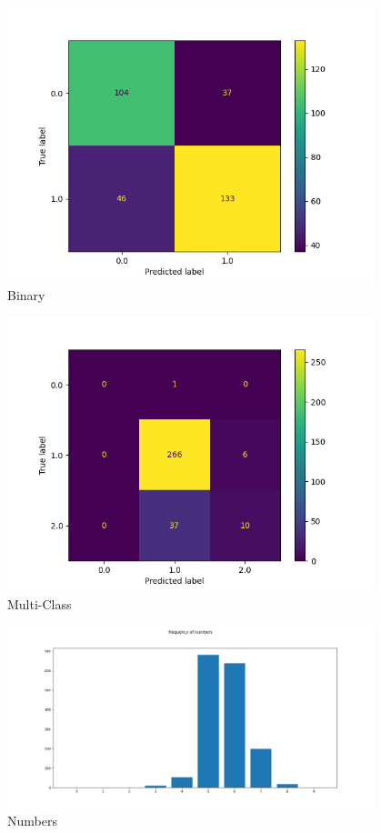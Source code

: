 \documentclass[11pt,a4paper]{scrartcl}
\begin{document}
\begin{figure}[h]
	\centering
	\includegraphics[width=0.95\textwidth]{conMatBinary.png}
	\caption{Binary}
	\label{fig:logo}
\end{figure}
\begin{figure}[h]
	\centering
	\includegraphics[width=0.95\textwidth]{conMatMulti.png}
	\caption{Multi-Class}
	\label{fig:logo}
\end{figure}	 
\begin{figure}[h]
	\centering
	\includegraphics[width=0.95\textwidth]{freqNum.png}
	\caption{Numbers}
	\label{fig:logo}
\end{figure}
\end{document}
